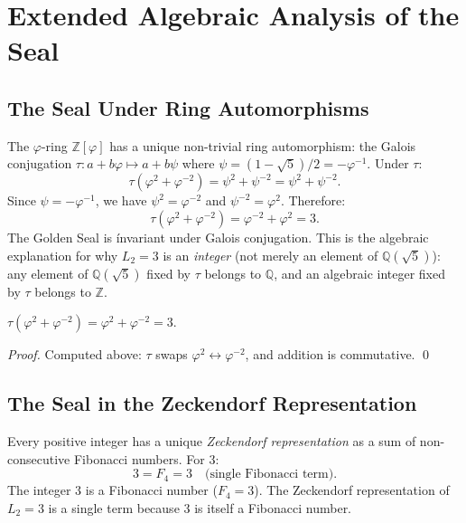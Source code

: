 \section{Extended Algebraic Analysis of the Seal}
\label{sec:gs-extended-algebra}

\subsection{The Seal Under Ring Automorphisms}

The $\varphi$-ring $\mathbb{Z}[\varphi]$ has a unique
non-trivial ring automorphism: the Galois conjugation
$\tau : a + b\varphi \mapsto a + b\psi$ where
$\psi = (1-\sqrt{5})/2 = -\varphi^{-1}$.
Under $\tau$:
\[
  \tau(\varphi^2 + \varphi^{-2})
  = \psi^2 + \psi^{-2}
  = \psi^2 + \psi^{-2}.
\]
Since $\psi = -\varphi^{-1}$, we have $\psi^2 = \varphi^{-2}$
and $\psi^{-2} = \varphi^2$.  Therefore:
\[
  \tau(\varphi^2 + \varphi^{-2}) = \varphi^{-2} + \varphi^2 = 3.
\]
The Golden Seal is \'invariant under Galois conjugation.
This is the algebraic explanation for why $L_2 = 3$ is an
\emph{integer} (not merely an element of $\mathbb{Q}(\sqrt{5})$):
any element of $\mathbb{Q}(\sqrt{5})$ fixed by $\tau$ belongs
to $\mathbb{Q}$, and an algebraic integer fixed by $\tau$
belongs to $\mathbb{Z}$.

\begin{proposition}\label{prop:galois-seal}
$\tau(\varphi^2 + \varphi^{-2}) = \varphi^2 + \varphi^{-2} = 3$.
\end{proposition}

\begin{proof}
Computed above: $\tau$ swaps $\varphi^2 \leftrightarrow
\varphi^{-2}$, and addition is commutative.
\qed
\end{proof}

\subsection{The Seal in the Zeckendorf Representation}

Every positive integer has a unique
\emph{Zeckendorf representation} as a sum of non-consecutive
Fibonacci numbers.  For $3$:
\[
  3 = F_4 = 3 \quad \text{(single Fibonacci term)}.
\]
The integer $3$ is a Fibonacci number ($F_4 = 3$).
The Zeckendorf representation of $L_2 = 3$ is a single term
because $3$ is itself a Fibonacci number.

